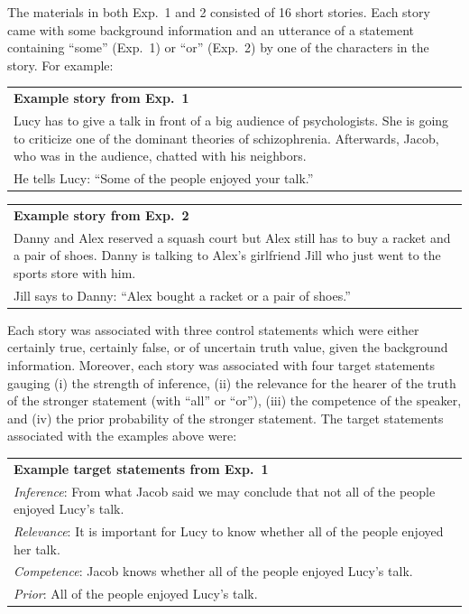\documentclass[12pt]{article}
\begin{document}
The materials in both Exp.\ 1 and 2 consisted of 16 short stories. Each story
came with some background information and an utterance of a statement containing ``some'' (Exp.\
1) or ``or'' (Exp.\ 2) by one of the characters in the story. For example:

\begin{center}
\begin{tabular}{p{10cm}}
\textbf{Example story from Exp.\ 1} \\
  Lucy has to give a talk in front of a big audience of psychologists. She is going to criticize one of the dominant theories of schizophrenia. Afterwards, Jacob, who was in the audience, chatted with his neighbors.\\[.2cm]
  He tells Lucy: ``Some of the people enjoyed your talk.''
\end{tabular}
\end{center}\vspace{-10pt}


\begin{center}
\begin{tabular}{p{10cm}}
\textbf{Example story from Exp.\ 2} \\
  Danny and Alex reserved a squash court but Alex still has to buy a racket and a pair of
  shoes. Danny is talking to Alex's girlfriend Jill who just went to the sports store with
  him.\\[.2cm]
  Jill says to Danny: ``Alex bought a racket or a pair of shoes.''
\end{tabular}
\end{center}\vspace{5pt}

\noindent Each story was associated with three control statements which were either certainly
true, certainly false, or of uncertain truth value, given the background information. Moreover,
each story was associated with four target statements gauging (i) the strength of inference,
(ii) the relevance for the hearer of the truth of the stronger statement (with ``all'' or
``or''), (iii) the competence of the speaker, and (iv) the prior probability of the stronger
statement. The target statements associated with the examples above were:

\begin{center}
\begin{tabular}{p{10cm}}
\textbf{Example target statements from Exp.\ 1} \\[.2cm]
\emph{Inference}: From what Jacob said we may conclude that not all of the people enjoyed Lucy's talk.\\[.1cm]
\emph{Relevance}: It is important for Lucy to know whether all of the people enjoyed her talk.\\[.1cm]
  \emph{Competence}: Jacob knows whether all of the people enjoyed Lucy's talk. \\[.1cm]
  \emph{Prior}: All of the people enjoyed Lucy's talk.
\end{tabular}
\end{center}
\end{document}
